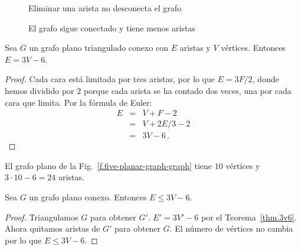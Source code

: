 \begin{figure}[ht]
\begin{minipage}{.45\textwidth}
\begin{center}
\caption{Eliminar una arista no desconecta el grafo}\label{f.five-connected-remains}
\end{center}
\end{minipage}
\hfill
\begin{minipage}{.45\textwidth}
\begin{center}
\caption{El grafo sigue conectado y tiene menos aristas}\label{f.five-connected-fewer}
\end{center}
\end{minipage}
\end{figure}

\begin{theorem}\label{thm.3v6}
Sea $G$ un grafo plano triangulado conexo con $E$ aristas y $V$ vértices. Entonces $E= 3V-6$.
\end{theorem}
\begin{proof}
Cada cara está limitada por tres aristas, por lo que $E=3F/2$, donde hemos dividido por $2$ porque cada arista se ha contado dos veces, una por cada cara que limita. Por la fórmula de Euler:
\begin{eqnarray*}
E&=&V+F-2\\
&=&V+2E/3-2\\
&=&3V-6\,.
\end{eqnarray*}
\end{proof}

\begin{example}
El grafo plano de la Fig.~\ref{f.five-planar-graph-graph} tiene $10$ vértices y $3\cdot 10-6=24$ aristas.
\end{example}

\begin{theorem}\label{thm.count}
Sea $G$ un grafo plano conexo. Entonces $E\leq 3V-6$.
\end{theorem}

\begin{proof}
Triangulamos $G$ para obtener $G'$. $E'= 3V'-6$ por el Teorema~\ref{thm.3v6}. Ahora quitamos aristas de $G'$ para obtener $G$. El número de vértices no cambia por lo que $E\leq 3V-6$.
\end{proof}

